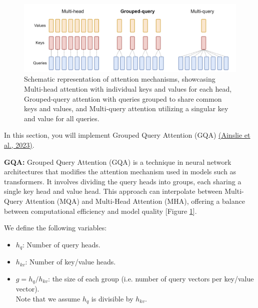 \documentclass[11pt,addpoints,answers]{exam}
\begin{document}
\begin{questions}
\begin{parts}
\clearpage


    \begin{figure}[h!]
        \centering
        \includegraphics[width=1\linewidth]{fig/GQA_arch_diagram.png}
        \caption{Schematic representation of attention mechanisms, showcasing Multi-head attention with individual keys and values for each head, Grouped-query attention with queries grouped to share common keys and values, and Multi-query attention utilizing a singular key and value for all queries.}
        \label{fig:GQA_arch_diagram}
    \end{figure}
    
    In this section, you will implement Grouped Query Attention (GQA) 
    \href{https://arxiv.org/pdf/2305.13245.pdf}{(Ainslie et al., 2023)}.
    
    \textbf{GQA:} Grouped Query Attention (GQA) is a technique in neural network architectures that modifies the attention mechanism used in models such as transformers. It involves dividing the query heads into groups, each sharing a single key head and value head. This approach can interpolate between Multi-Query Attention (MQA) and Multi-Head Attention (MHA), offering a balance between computational efficiency and model quality [Figure \ref{fig:GQA_arch_diagram}].

    We define the following variables:
    \begin{itemize}
        \item \( h_q \): Number of query heads.
        \item \( h_{kv} \): Number of key/value heads.
        \item \( g = h_q / h_{kv} \): the size of each group (i.e. number of query vectors per key/value vector). \\ Note that we assume \( h_q \) is divisible by \( h_{kv} \).
    \end{itemize}


\end{parts}
\end{questions}
\end{document}
